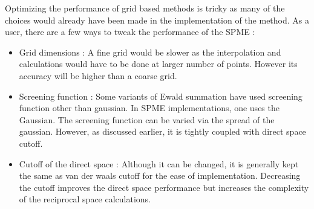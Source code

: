 \documentclass[9pt,bestpractices]{livecoms}
\begin{document}
Optimizing the performance of grid based methods is tricky as many of the choices would already have been made in the implementation of the method. As a user, there are a few ways to tweak the performance of the SPME : 
 
\begin{itemize}
\item Grid dimensions : A fine grid would be slower as the interpolation and calculations would have to be done at larger number of points. However its accuracy will be higher than a coarse grid.
\item Screening function : Some variants of Ewald summation have used screening function other than  gaussian. In SPME implementations, one uses the Gaussian. The screening function can be varied via the spread of the gaussian.  However, as discussed earlier, it is tightly coupled with direct space cutoff.
\item Cutoff of the direct space : Although it can be changed, it is generally kept the same as van der waals cutoff for the ease of implementation. Decreasing the cutoff improves the direct space performance but increases the complexity of the reciprocal space calculations. 
\end{itemize}
\end{document}
